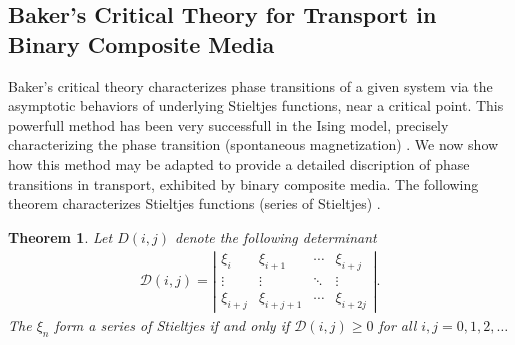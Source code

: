 \documentclass[english,12pt,jmp,graphicx]{revtex4-1}
\newtheorem{theorem}{Theorem}[section]
\newtheorem{definition}{Definition}[section]
\newcommand{\ph}{\hat{\phi}}
\begin{document}
\subsection{Baker's Critical Theory for Transport in Binary Composite
  Media}
%
Baker's critical theory characterizes phase transitions of a given system
via the asymptotic behaviors of underlying Stieltjes functions, near a
critical point. This powerfull method has been very successfull in the
Ising model, precisely characterizing the phase transition
(spontaneous magnetization) \cite{Baker-1990}.
We now show how this method may be adapted to provide a detailed
discription of phase transitions in transport, exhibited by binary
composite media.    
%
%
The following theorem
characterizes Stieltjes functions (series of Stieltjes) \cite{Baker-1990}.  
% 
\begin{theorem} \label{thm:stieltjes_Characterization}
   Let $D(i,j)$ denote the following determinant
    \begin{align} \label{eq:Detf} 
     \mathcal{D}(i,j) = \left|
                 \begin{matrix}
                   \xi_i&\xi_{i+1}&\cdots&\xi_{i+j}\\ 
                   \vdots&\vdots&\ddots&\vdots\\
                   \xi_{i+j}&\xi_{i+j+1}&\cdots&\xi_{i+2j}                            
                   \end{matrix}
              \right| .
   \end{align}
   The $\xi_n$ form a series of Stieltjes if and only if
   $\mathcal{D}(i,j) \geq 0$ for all $i,j =0,1,2,\ldots$ 

 \end{theorem} 
\end{document}
